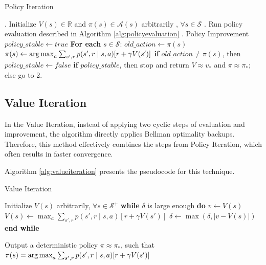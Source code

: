 \begin{algorithm}
	\caption{Policy Iteration}
	\begin{algorithmic}
		. Initialize $V(s) \in \mathbb{R}$ and $\pi(s) \in \mathcal{A}(s)$ arbitrarily , $\forall s \in \mathcal{S}$ 
		. Run policy evaluation described in Algorithm \ref{alg:policyevaluation}
		. Policy Improvement
		\STATE \hspace{5mm} $policy \_ stable \leftarrow true$
		\STATE \hspace{5mm}\textbf{ For each} $s \in \mathcal{S}$:
		\STATE \hspace{10mm} $old\_action \leftarrow \pi(s)$
		\STATE \hspace{10mm} $\pi(s) \leftarrow \operatorname*{arg\,max}_{a} \sum_{s',r} p(s', r \mid s,a)[r + \gamma V(s')]$
		\STATE \hspace{10mm} \textbf{if} $old\_action \neq \pi(s)$, then $policy \_ stable \leftarrow false$
		\STATE \hspace{5mm} \textbf{if} $policy \_ stable$, then stop and return $V \approx v_{*}$ and $\pi \approx \pi_{*}$; else go to 2.
	\end{algorithmic}
	\label{alg:policyiteration}	
\end{algorithm}

\subsection{Value Iteration}

In the Value Iteration, instead of applying two cyclic steps of evaluation and improvement, the algorithm directly applies Bellman optimality backups. Therefore, this method effectively combines the steps from Policy Iteration, which often results in faster convergence.

Algorithm \ref{alg:valueiteration} presents the pseudocode for this technique.


\begin{algorithm}
	\caption{Value Iteration}
	\begin{algorithmic}

		\STATE Initialize $V(s)$ arbitrarily, $\forall s \in \mathcal{S}^{+}$ 
		\STATE \textbf{while} $\delta$ is large enough \textbf{do}
		\STATE \hspace{5mm} $v \leftarrow V(s)$
		\STATE \hspace{5mm} $V(s) \leftarrow \max_{a} \sum_{s',r} p(s',r \mid s,a)[r + \gamma V(s')]$
		\STATE \hspace{5mm} $\delta \leftarrow \max(\delta, \lvert v - V(s) \rvert)$
		\STATE \textbf{end while} 
		
		\STATE Output a deterministic policy $\pi \approx \pi_{*}$, such that
		\STATE \hspace{5mm} $\pi(s) = \operatorname*{arg\,max}_{a} \sum_{s', r}p(s',r \mid s,a)[r + \gamma V(s')]$	
	\end{algorithmic}
	\label{alg:valueiteration}	
\end{algorithm}

